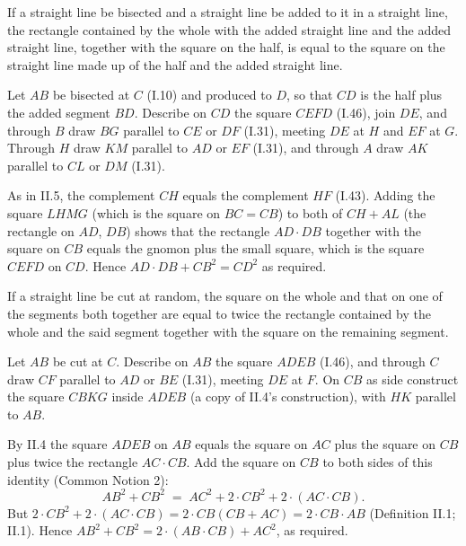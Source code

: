 \begin{claim}
\label{prop:II.6}
If a straight line be bisected and a straight line be added to it in
a straight line, the rectangle contained by the whole with the added
straight line and the added straight line, together with the square
on the half, is equal to the square on the straight line made up of
the half and the added straight line.
\end{claim}
\begin{evidence}[Proof of II.6]
\label{ev:II.6}
Let $AB$ be bisected at $C$ (I.10) and produced to $D$, so that $CD$
is the half plus the added segment $BD$.  Describe on $CD$ the
square $CEFD$ (I.46), join $DE$, and through $B$ draw $BG$ parallel
to $CE$ or $DF$ (I.31), meeting $DE$ at $H$ and $EF$ at $G$.
Through $H$ draw $KM$ parallel to $AD$ or $EF$ (I.31), and through
$A$ draw $AK$ parallel to $CL$ or $DM$ (I.31).

As in II.5, the complement $CH$ equals the complement $HF$ (I.43).
Adding the square $LHMG$ (which is the square on $BC = CB$) to both
of $CH + AL$ (the rectangle on $AD$, $DB$) shows that the rectangle
$AD\cdot DB$ together with the square on $CB$ equals the gnomon plus
the small square, which is the square $CEFD$ on $CD$.  Hence
$AD\cdot DB + CB^2 = CD^2$ as required.
\end{evidence}

\begin{claim}
\label{prop:II.7}
If a straight line be cut at random, the square on the whole and that
on one of the segments both together are equal to twice the rectangle
contained by the whole and the said segment together with the square
on the remaining segment.
\end{claim}
\begin{evidence}[Proof of II.7]
\label{ev:II.7}
Let $AB$ be cut at $C$.  Describe on $AB$ the square $ADEB$ (I.46),
and through $C$ draw $CF$ parallel to $AD$ or $BE$ (I.31), meeting
$DE$ at $F$.  On $CB$ as side construct the square $CBKG$ inside
$ADEB$ (a copy of II.4's construction), with $HK$ parallel to $AB$.

By II.4 the square $ADEB$ on $AB$ equals the square on $AC$ plus the
square on $CB$ plus twice the rectangle $AC \cdot CB$.  Add the
square on $CB$ to both sides of this identity (Common Notion 2):
\[
    AB^2 + CB^2 \;=\; AC^2 + 2\cdot CB^2 + 2\cdot(AC\cdot CB).
\]
But $2\cdot CB^2 + 2\cdot(AC\cdot CB) = 2\cdot CB(CB + AC) =
2\cdot CB \cdot AB$ (Definition II.1; II.1).  Hence
$AB^2 + CB^2 = 2\cdot(AB\cdot CB) + AC^2$, as required.
\end{evidence}

